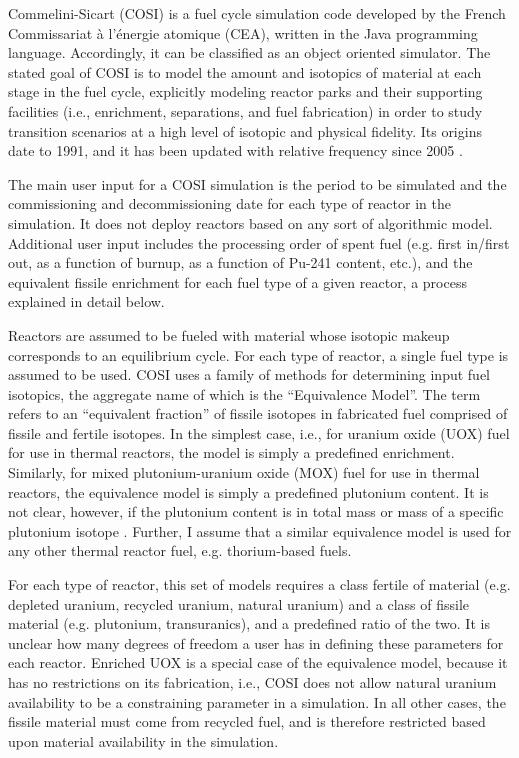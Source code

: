 Commelini-Sicart (COSI) is a fuel cycle simulation code developed by the French
Commissariat \`{a} l'\'{e}nergie atomique (CEA), written in the Java programming
language. Accordingly, it can be classified as an object oriented simulator. The
stated goal of COSI is to model the amount and isotopics of material at each
stage in the fuel cycle, explicitly modeling reactor parks and their supporting
facilities (i.e., enrichment, separations, and fuel fabrication) in order to
study transition scenarios at a high level of isotopic and physical
fidelity. Its origins date to 1991, and it has been updated with relative
frequency since 2005 \cite{boucher_cosi_2005,boucher_cosi:_2006,meyer_new_2009,
coquelet-pascal_validation_2011}.

The main user input for a COSI simulation is the period to be simulated and the
commissioning and decommissioning date for each type of reactor in the
simulation. It does not deploy reactors based on any sort of algorithmic
model. Additional user input includes the processing order of spent fuel
(e.g. first in/first out, as a function of burnup, as a function of Pu-241
content, etc.), and the equivalent fissile enrichment for each fuel type of a
given reactor, a process explained in detail below.

Reactors are assumed to be fueled with material whose isotopic makeup
corresponds to an equilibrium cycle. For each type of reactor, a single fuel
type is assumed to be used. COSI uses a family of methods for determining input
fuel isotopics, the aggregate name of which is the ``Equivalence Model''. The
term refers to an ``equivalent fraction'' of fissile isotopes in fabricated fuel
comprised of fissile and fertile isotopes. In the simplest case, i.e., for
uranium oxide (UOX) fuel for use in thermal reactors, the model is simply a
predefined enrichment.  Similarly, for mixed plutonium-uranium oxide (MOX) fuel
for use in thermal reactors, the equivalence model is simply a predefined
plutonium content. It is not clear, however, if the plutonium content is in
total mass or mass of a specific plutonium isotope \cite{meyer_new_2009,
  coquelet-pascal_validation_2011}. Further, I assume that a similar equivalence
model is used for any other thermal reactor fuel, e.g. thorium-based fuels.

For each type of reactor, this set of models requires a class fertile of
material (e.g. depleted uranium, recycled uranium, natural uranium) and a class
of fissile material (e.g. plutonium, transuranics), and a predefined ratio of
the two. It is unclear how many degrees of freedom a user has in defining these
parameters for each reactor. Enriched UOX is a special case of the equivalence
model, because it has no restrictions on its fabrication, i.e., COSI does not
allow natural uranium availability to be a constraining parameter in a
simulation. In all other cases, the fissile material must come from recycled
fuel, and is therefore restricted based upon material availability in the
simulation.

